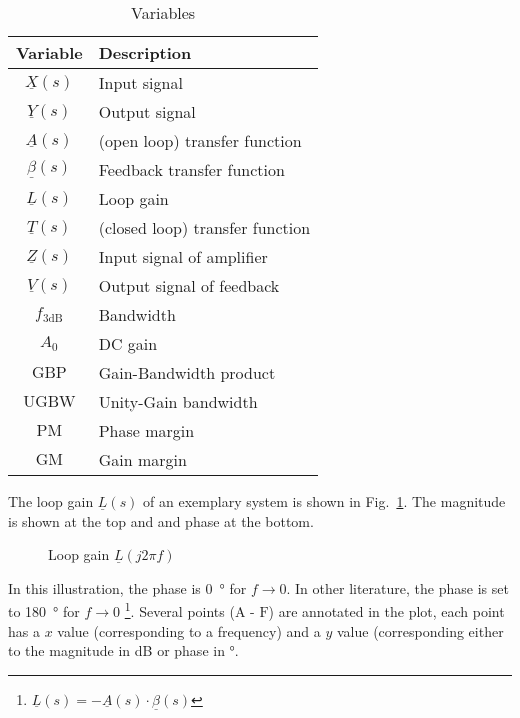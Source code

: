 \documentclass{article}[11pt]
\begin{document}
\begin{table}[H]
\centering
\caption{Variables}
\begin{tabular}{cl}
\toprule
\textbf{Variable}       & \textbf{Description}            \\ \midrule
$\underline{X}(s)$      & Input signal                    \\ 
$\underline{Y}(s)$      & Output signal                   \\
$\underline{A}(s)$      & (open loop) transfer function   \\
$\underline{\beta}(s)$  & Feedback transfer function      \\
$\underline{L}(s)$      & Loop gain                       \\
$\underline{T}(s)$      & (closed loop) transfer function \\
$\underline{Z}(s)$      & Input signal of amplifier       \\
$\underline{V}(s)$      & Output signal of feedback       \\
$f_{\mathrm{3dB}}$      & Bandwidth                       \\
$A_{\mathrm{0}}$        & DC gain                         \\
$\mathrm{GBP}$          & Gain-Bandwidth product          \\
$\mathrm{UGBW}$         & Unity-Gain bandwidth            \\
$\mathrm{PM}$           & Phase margin                    \\
$\mathrm{GM}$           & Gain margin                     \\ \toprule
\end{tabular}
\label{tab:variables}
\end{table}

The loop gain $\underline{L}(s)$ of an exemplary system is shown in 
Fig.~\ref{fig:ls}.
The magnitude is shown at the top and and phase at the bottom.

\begin{figure}[H]
  \centering
  \begin{tikzpicture}
    
  \end{tikzpicture}
  \caption{Loop gain $\underline{L}(j 2 \pi f)$}
  \label{fig:ls}
\end{figure}


In this illustration, the phase is \SI{0}{\degree} for $f \rightarrow 0$.
In other literature, the phase is set to \SI{180}{\degree} for 
$f \rightarrow 0$%
\footnote{$\underline{L}(s) = -\underline{A}(s) \cdot \underline{\beta}(s)$}.
Several points ($\mathrm{A}$ - $\mathrm{F}$) are annotated in the plot, each 
point has a $x$ value (corresponding to a frequency) and a $y$ value 
(corresponding either to the magnitude in dB or phase in \si{\degree}.
\end{document}
